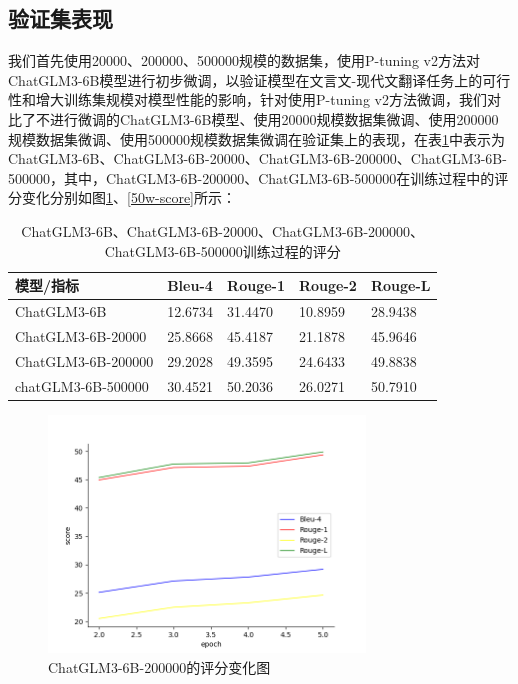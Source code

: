 \documentclass[
    decl-page,  %
    ,fontset = win, %
  ]{njuthesis}
\begin{document}
\subsection{验证集表现}
我们首先使用20000、200000、500000规模的数据集，使用P-tuning v2方法对ChatGLM3-6B模型进行初步微调，以验证模型在文言文-现代文翻译任务上的可行性和增大训练集规模对模型性能的影响，针对使用P-tuning v2方法微调，我们对比了不进行微调的ChatGLM3-6B模型、使用20000规模数据集微调、使用200000规模数据集微调、使用500000规模数据集微调在验证集上的表现，在表\ref{score1}中表示为ChatGLM3-6B、ChatGLM3-6B-20000、ChatGLM3-6B-200000、ChatGLM3-6B-500000，其中，ChatGLM3-6B-200000、ChatGLM3-6B-500000在训练过程中的评分变化分别如图\ref{20w-score}、\ref{50w-score}所示：

\begin{table}[h]
\renewcommand\arraystretch{1.5}
\caption{ChatGLM3-6B、ChatGLM3-6B-20000、ChatGLM3-6B-200000、ChatGLM3-6B-500000训练过程的评分}
\label{score1}
\begin{tabular}{|l|l|l|l|l|}
\hline
\textbf{模型/指标}     & \textbf{Bleu-4} & \textbf{Rouge-1} & \textbf{Rouge-2} & \textbf{Rouge-L} \\ \hline
ChatGLM3-6B        & 12.6734         & 31.4470          & 10.8959          & 28.9438          \\ \hline
ChatGLM3-6B-20000  & 25.8668         & 45.4187          & 21.1878          & 45.9646          \\ \hline
ChatGLM3-6B-200000 & 29.2028         & 49.3595          & 24.6433          & 49.8838          \\ \hline
chatGLM3-6B-500000 & 30.4521         & 50.2036          & 26.0271          & 50.7910           \\ \hline
\end{tabular}
\end{table}

\begin{figure}[h]
  \centering
  \includegraphics[width=0.75\textwidth]{image/20w-score.png}
  \caption{ChatGLM3-6B-200000的评分变化图}
  \label{20w-score}
\end{figure}
\end{document}

